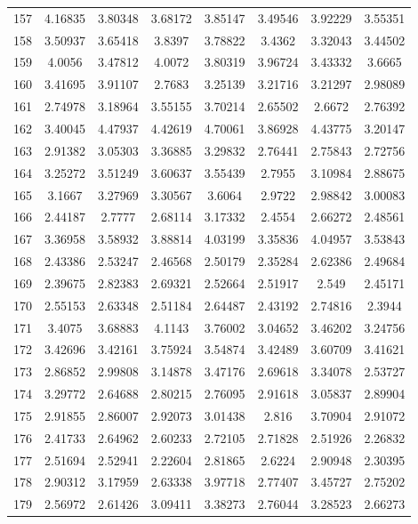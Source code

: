 \begin{center}
\begin{longtable}{cccccccc}
157 & 4.16835 & 3.80348 & 3.68172 & 3.85147 & 3.49546 & 3.92229 & 3.55351\\
158 & 3.50937 & 3.65418 & 3.8397 & 3.78822 & 3.4362 & 3.32043 & 3.44502\\
159 & 4.0056 & 3.47812 & 4.0072 & 3.80319 & 3.96724 & 3.43332 & 3.6665\\
160 & 3.41695 & 3.91107 & 2.7683 & 3.25139 & 3.21716 & 3.21297 & 2.98089\\
161 & 2.74978 & 3.18964 & 3.55155 & 3.70214 & 2.65502 & 2.6672 & 2.76392\\
162 & 3.40045 & 4.47937 & 4.42619 & 4.70061 & 3.86928 & 4.43775 & 3.20147\\
163 & 2.91382 & 3.05303 & 3.36885 & 3.29832 & 2.76441 & 2.75843 & 2.72756\\
164 & 3.25272 & 3.51249 & 3.60637 & 3.55439 & 2.7955 & 3.10984 & 2.88675\\
165 & 3.1667 & 3.27969 & 3.30567 & 3.6064 & 2.9722 & 2.98842 & 3.00083\\
166 & 2.44187 & 2.7777 & 2.68114 & 3.17332 & 2.4554 & 2.66272 & 2.48561\\
167 & 3.36958 & 3.58932 & 3.88814 & 4.03199 & 3.35836 & 4.04957 & 3.53843\\
168 & 2.43386 & 2.53247 & 2.46568 & 2.50179 & 2.35284 & 2.62386 & 2.49684\\
169 & 2.39675 & 2.82383 & 2.69321 & 2.52664 & 2.51917 & 2.549 & 2.45171\\
170 & 2.55153 & 2.63348 & 2.51184 & 2.64487 & 2.43192 & 2.74816 & 2.3944\\
171 & 3.4075 & 3.68883 & 4.1143 & 3.76002 & 3.04652 & 3.46202 & 3.24756\\
172 & 3.42696 & 3.42161 & 3.75924 & 3.54874 & 3.42489 & 3.60709 & 3.41621\\
173 & 2.86852 & 2.99808 & 3.14878 & 3.47176 & 2.69618 & 3.34078 & 2.53727\\
174 & 3.29772 & 2.64688 & 2.80215 & 2.76095 & 2.91618 & 3.05837 & 2.89904\\
175 & 2.91855 & 2.86007 & 2.92073 & 3.01438 & 2.816 & 3.70904 & 2.91072\\
176 & 2.41733 & 2.64962 & 2.60233 & 2.72105 & 2.71828 & 2.51926 & 2.26832\\
177 & 2.51694 & 2.52941 & 2.22604 & 2.81865 & 2.6224 & 2.90948 & 2.30395\\
178 & 2.90312 & 3.17959 & 2.63338 & 3.97718 & 2.77407 & 3.45727 & 2.75202\\
179 & 2.56972 & 2.61426 & 3.09411 & 3.38273 & 2.76044 & 3.28523 & 2.66273\\

\end{longtable}
\end{center}

